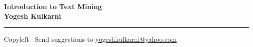 
\graphicspath{{images/}}

\footnotesize


\begin{center}
\Large{\textbf{Introduction to Text Mining\\ Yogesh Kulkarni}}  
\end{center}

\begin{multicols}{2}

\end{multicols}

\rule{\linewidth}{0.25pt}
\scriptsize
Copyleft \textcopyleft\  Send suggestions to 
\href{http://www.yogeshkulkarni.com}{yogeshkulkarni@yahoo.com}


